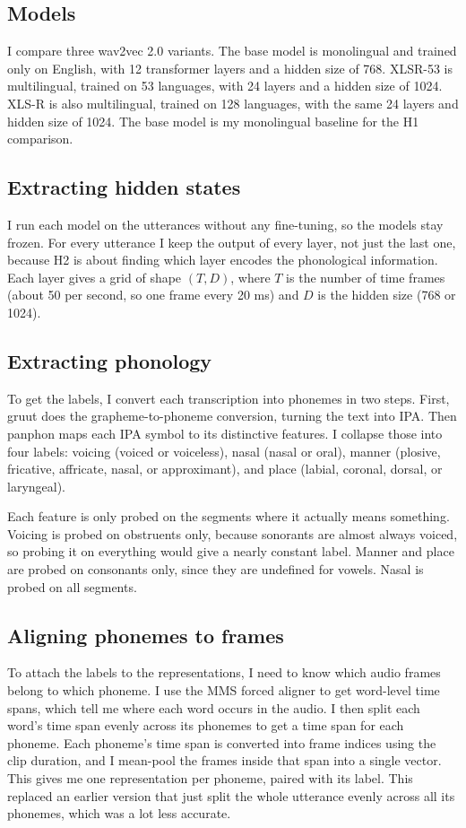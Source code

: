 \documentclass[twoside,11pt]{article}
\begin{document}
\subsection{Models}
I compare three wav2vec 2.0 variants. The base model is monolingual and trained
only on English, with 12 transformer layers and a hidden size of 768. XLSR-53 is
multilingual, trained on 53 languages, with 24 layers and a hidden size of 1024.
XLS-R is also multilingual, trained on 128 languages, with the same 24 layers and
hidden size of 1024. The base model is my monolingual baseline for the H1
comparison.

\subsection{Extracting hidden states}
I run each model on the utterances without any fine-tuning, so the models stay
frozen. For every utterance I keep the output of every layer, not just the last
one, because H2 is about finding which layer encodes the phonological information.
Each layer gives a grid of shape $(T, D)$, where $T$ is the number of time frames
(about 50 per second, so one frame every 20 ms) and $D$ is the hidden size (768 or
1024).

\subsection{Extracting phonology}
To get the labels, I convert each transcription into phonemes in two steps. First,
gruut does the grapheme-to-phoneme conversion, turning the text into IPA. Then
panphon \citep{mortensen2016panphon} maps each IPA symbol to its distinctive
features. I collapse those into four labels: voicing (voiced or voiceless), nasal
(nasal or oral), manner (plosive, fricative, affricate, nasal, or approximant),
and place (labial, coronal, dorsal, or laryngeal).

Each feature is only probed on the segments where it actually means something.
Voicing is probed on obstruents only, because sonorants are almost always voiced,
so probing it on everything would give a nearly constant label. Manner and place
are probed on consonants only, since they are undefined for vowels. Nasal is
probed on all segments.

\subsection{Aligning phonemes to frames}
To attach the labels to the representations, I need to know which audio frames
belong to which phoneme. I use the MMS forced aligner \citep{pratap2024mms} to get
word-level time spans, which tell me where each word occurs in the audio. I then
split each word's time span evenly across its phonemes to get a time span for each
phoneme. Each phoneme's time span is converted into frame indices using the clip
duration, and I mean-pool the frames inside that span into a single vector. This
gives me one representation per phoneme, paired with its label. This replaced an
earlier version that just split the whole utterance evenly across all its
phonemes, which was a lot less accurate.
\end{document}
